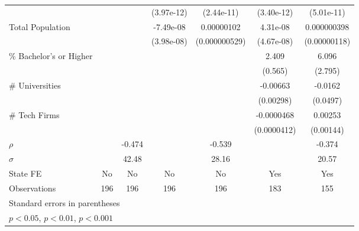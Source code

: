 {\begin{tabular}{l*{6}{c}}
                    &                     &                     &  (3.97e-12)         &  (2.44e-11)         &  (3.40e-12)         &  (5.01e-11)         \\
\addlinespace
Total Population    &                     &                     &   -7.49e-08         &  0.00000102         &    4.31e-08         & 0.000000398         \\
                    &                     &                     &  (3.98e-08)         &(0.000000529)         &  (4.67e-08)         &(0.00000118)         \\
\addlinespace
\% Bachelor's or Higher&                     &                     &                     &                     &       2.409\sym{***}&       6.096\sym{*}  \\
                    &                     &                     &                     &                     &     (0.565)         &     (2.795)         \\
\addlinespace
\# Universities     &                     &                     &                     &                     &    -0.00663\sym{*}  &     -0.0162         \\
                    &                     &                     &                     &                     &   (0.00298)         &    (0.0497)         \\
\addlinespace
\# Tech Firms       &                     &                     &                     &                     &  -0.0000468         &     0.00253         \\
                    &                     &                     &                     &                     & (0.0000412)         &   (0.00144)         \\
\midrule
\(\rho\)            &                     &      -0.474         &                     &      -0.539         &                     &      -0.374         \\
\(\sigma\)          &                     &       42.48         &                     &       28.16         &                     &       20.57         \\
State FE            &          No         &          No         &          No         &          No         &         Yes         &         Yes         \\
Observations        &         196         &         196         &         196         &         196         &         183         &         155         \\
\bottomrule
\multicolumn{7}{l}{\footnotesize Standard errors in parentheses}\\
\multicolumn{7}{l}{\footnotesize \sym{*} \(p<0.05\), \sym{**} \(p<0.01\), \sym{***} \(p<0.001\)}\\
\end{tabular}
}
